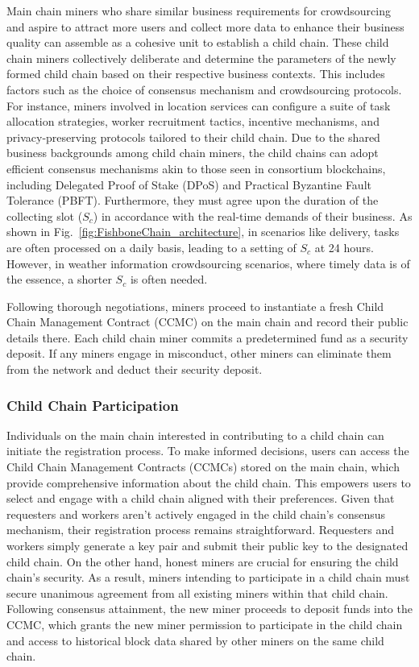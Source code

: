 \documentclass[10pt,journal]{IEEEtran}
\begin{document}
Main chain miners who share similar business requirements for crowdsourcing and aspire to attract more users and collect more data to enhance their business quality can assemble as a cohesive unit to establish a child chain. These child chain miners collectively deliberate and determine the parameters of the newly formed child chain based on their respective business contexts. This includes factors such as the choice of consensus mechanism and crowdsourcing protocols. For instance, miners involved in location services can configure a suite of task allocation strategies, worker recruitment tactics, incentive mechanisms, and privacy-preserving protocols tailored to their child chain. Due to the shared business backgrounds among child chain miners, the child chains can adopt efficient consensus mechanisms akin to those seen in consortium blockchains, including Delegated Proof of Stake (DPoS) and Practical Byzantine Fault Tolerance (PBFT). Furthermore, they must agree upon the duration of the collecting slot ($S_c$) in accordance with the real-time demands of their business. As shown in Fig.~\ref{fig:FishboneChain_architecture}, in scenarios like delivery, tasks are often processed on a daily basis, leading to a setting of $S_c$ at 24 hours. However, in weather information crowdsourcing scenarios, where timely data is of the essence, a shorter $S_c$ is often needed.

Following thorough negotiations, miners proceed to instantiate a fresh Child Chain Management Contract (CCMC) on the main chain and record their public details there. Each child chain miner commits a predetermined fund as a security deposit. If any miners engage in misconduct, other miners can eliminate them from the network and deduct their security deposit.

\subsubsection{\textbf{Child Chain Participation}}

Individuals on the main chain interested in contributing to a child chain can initiate the registration process. To make informed decisions, users can access the Child Chain Management Contracts (CCMCs) stored on the main chain, which provide comprehensive information about the child chain. This empowers users to select and engage with a child chain aligned with their preferences. Given that requesters and workers aren't actively engaged in the child chain's consensus mechanism, their registration process remains straightforward. Requesters and workers simply generate a key pair and submit their public key to the designated child chain. On the other hand, honest miners are crucial for ensuring the child chain's security. As a result, miners intending to participate in a child chain must secure unanimous agreement from all existing miners within that child chain. Following consensus attainment, the new miner proceeds to deposit funds into the CCMC, which grants the new miner permission to participate in the child chain and access to historical block data shared by other miners on the same child chain.
\end{document}
